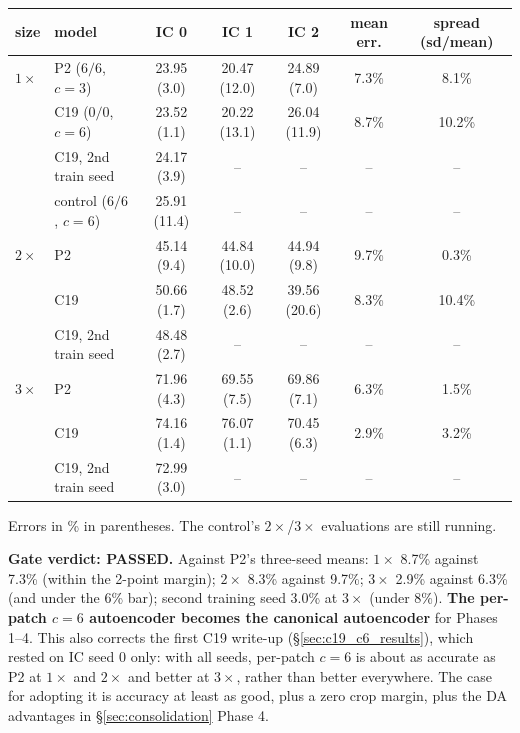 \documentclass[11pt]{article}
\begin{document}
\begin{center}
\small
\begin{tabular}{llccccc}
\toprule
size & model & IC 0 & IC 1 & IC 2 & mean err. & spread (sd/mean) \\
\midrule
$1\times$ & P2 ($6/6$, $c{=}3$) & 23.95 (3.0) & 20.47 (12.0) & 24.89 (7.0) & 7.3\% & 8.1\% \\
 & C19 ($0/0$, $c{=}6$) & 23.52 (1.1) & 20.22 (13.1) & 26.04 (11.9) & 8.7\% & 10.2\% \\
 & C19, 2nd train seed & 24.17 (3.9) & -- & -- & -- & -- \\
 & control ($6/6$, $c{=}6$) & 25.91 (11.4) & -- & -- & -- & -- \\
\midrule
$2\times$ & P2 & 45.14 (9.4) & 44.84 (10.0) & 44.94 (9.8) & 9.7\% & 0.3\% \\
 & C19 & 50.66 (1.7) & 48.52 (2.6) & 39.56 (20.6) & 8.3\% & 10.4\% \\
 & C19, 2nd train seed & 48.48 (2.7) & -- & -- & -- & -- \\
\midrule
$3\times$ & P2 & 71.96 (4.3) & 69.55 (7.5) & 69.86 (7.1) & 6.3\% & 1.5\% \\
 & C19 & 74.16 (1.4) & 76.07 (1.1) & 70.45 (6.3) & 2.9\% & 3.2\% \\
 & C19, 2nd train seed & 72.99 (3.0) & -- & -- & -- & -- \\
\bottomrule
\end{tabular}
\end{center}
Errors in \% in parentheses. The control's $2\times$/$3\times$ evaluations
are still running.

\textbf{Gate verdict: PASSED.} Against P2's three-seed means: $1\times$
8.7\% against 7.3\% (within the 2-point margin); $2\times$ 8.3\% against
9.7\%; $3\times$ 2.9\% against 6.3\% (and under the 6\% bar); second
training seed 3.0\% at $3\times$ (under 8\%). \textbf{The per-patch
$c{=}6$ autoencoder becomes the canonical autoencoder} for Phases 1--4.
This also corrects the first C19 write-up
(\S\ref{sec:c19_c6_results}), which rested on IC seed 0 only: with all
seeds, per-patch $c{=}6$ is about as accurate as P2 at $1\times$ and
$2\times$ and better at $3\times$, rather than better everywhere. The case
for adopting it is accuracy at least as good, plus a zero crop margin,
plus the DA advantages in \S\ref{sec:consolidation} Phase 4.
\end{document}
